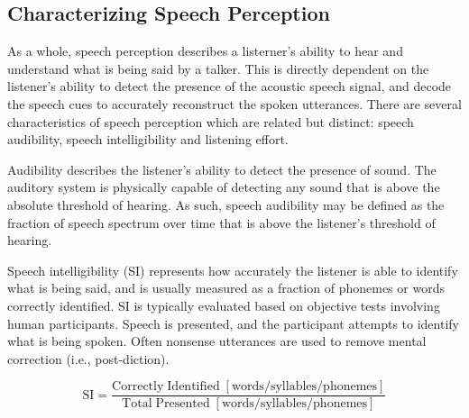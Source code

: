 \subsection{Characterizing Speech Perception} \label{section_perception}

As a whole, speech perception describes a listerner's ability to hear and understand what is being said by a talker. This is directly dependent on the listener's ability to detect the presence of the acoustic speech signal, and decode the speech cues to accurately reconstruct the spoken utterances. There are several characteristics of speech perception which are related but distinct: speech audibility, speech intelligibility and listening effort.

Audibility describes the listener's ability to detect the presence of sound. The auditory system is physically capable of detecting any sound that is above the absolute threshold of hearing. As such, speech audibility may be defined as the fraction of speech spectrum over time that is above the listener's threshold of hearing.

Speech intelligibility (SI) represents how accurately the listener is able to identify what is being said, and is usually measured as a fraction of phonemes or words correctly identified. SI is typically evaluated based on objective tests involving human participants. Speech is presented, and the participant attempts to identify what is being spoken. Often nonsense utterances are used to remove mental correction (i.e., post-diction). 

\[\mathrm{SI} = \frac{\mathrm{Correctly \; Identified \; [words/syllables/phonemes]}}{\mathrm{Total \; Presented \;  [words/syllables/phonemes]}}\]


